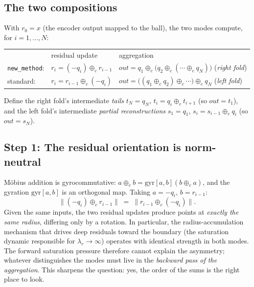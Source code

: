 \documentclass{article}
\begin{document}
\subsection*{The two compositions}
With $r_0 = x$ (the encoder output mapped to the ball), the two modes compute, for $i = 1,\dots,N$:
\begin{center}
\begin{tabular}{lll}
 & residual update & aggregation \\
\texttt{new\_method}: & $r_i = (-q_i) \oplus_c r_{i-1}$ & $out = q_1 \oplus_c \big(q_2 \oplus_c (\cdots \oplus_c q_N)\big)$ \quad (\emph{right fold}) \\
standard: & $r_i = r_{i-1} \oplus_c (-q_i)$ & $out = \big((q_1 \oplus_c q_2) \oplus_c \cdots\big) \oplus_c q_N$ \quad (\emph{left fold})
\end{tabular}
\end{center}
Define the right fold's intermediate \emph{tails} $t_N = q_N$, $t_i = q_i \oplus_c t_{i+1}$ (so $out = t_1$), and the left fold's intermediate \emph{partial reconstructions} $s_1 = q_1$, $s_i = s_{i-1} \oplus_c q_i$ (so $out = s_N$).

\subsection*{Step 1: The residual orientation is norm-neutral}
M\"obius addition is gyrocommutative: $a \oplus_c b = \text{gyr}[a, b](b \oplus_c a)$, and the gyration $\text{gyr}[a,b]$ is an orthogonal map. Taking $a = -q_i$, $b = r_{i-1}$:
\begin{equation}
    \big\|(-q_i) \oplus_c r_{i-1}\big\| \;=\; \big\| r_{i-1} \oplus_c (-q_i) \big\|.
\end{equation}
Given the same inputs, the two residual updates produce points at \emph{exactly the same radius}, differing only by a rotation. In particular, the radius-accumulation mechanism that drives deep residuals toward the boundary (the saturation dynamic responsible for $\lambda_r \to \infty$) operates with identical strength in both modes. The forward saturation pressure therefore cannot explain the asymmetry; whatever distinguishes the modes must live in the \emph{backward pass of the aggregation}. This sharpens the question: yes, the order of the sums is the right place to look.
\end{document}
